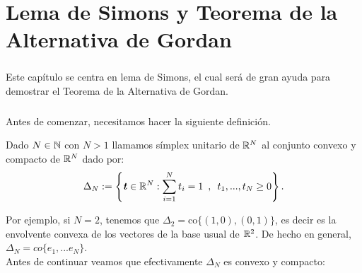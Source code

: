 \chapter{Lema de Simons y Teorema de la Alternativa de Gordan}
	\thispagestyle{empty}
	\newcommand{\ttt}{\textbf{\emph{t}}}
	\newcommand{\sss}{\textbf{\emph{s}}}
	
	\paragraph{}Este capítulo se centra en lema de Simons, el cual será de gran ayuda para demostrar el Teorema de la Alternativa de Gordan.

	\paragraph{}Antes de comenzar, necesitamos hacer la siguiente definición.
	
	\begin{definicion}
		Dado $ N \in \mathbb{N} $ con $ N > 1 $ llamamos símplex unitario de $ \mathbb{R}^N $ al conjunto convexo y compacto de $ \mathbb{R}^N $ dado por:
		\begin{equation*}
			\Delta_N := \left\lbrace \ttt \in \RR^N: \sum_{i=1}^{N}{t_i} = 1 \hspace{0.5em} , \hspace{0.5em} t_1,...,t_N \geq 0 \right\rbrace .
		\end{equation*}
	\end{definicion}

	Por ejemplo, si $ N = 2 $, tenemos que $ \Delta_2 = \mathrm{co} \{(1,0),(0,1)\}$, es decir es la envolvente convexa de los vectores de la base usual de $ \mathbb{R}^2 $. De hecho en general, $ \Delta_N = co\{e_1,...e_N\} $. \\
	
	Antes de continuar veamos que efectivamente $ \Delta_N $ es convexo y compacto:
	
